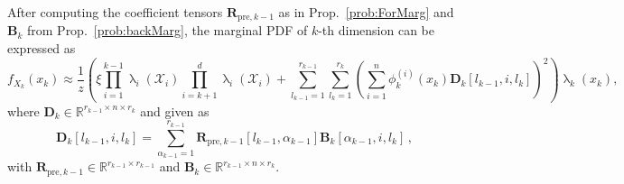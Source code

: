 After computing the coefficient tensors $\bm{R}_{\text{pre},k-1}$ as in Prop.~\ref{prob:ForMarg} and $\bm{B}_{k}$ from Prop.~\ref{prob:backMarg}, the marginal PDF of $k$-th dimension can be expressed as
\begin{equation}
	f_{X_k}(x_k)  \approx \frac{1}{z} \left(\xi \prod_{i=1}^{k-1} \uplambda_i(\mathcal{X}_i) \prod_{i=k+1}^{d} \uplambda_i(\mathcal{X}_i) + \sum_{l_{k-1}=1}^{r_{k-1}} \sum_{l_k=1}^{r_k} \left(\sum_{i=1}^{n} \phi^{(i)}_k(x_k) \bm{D}_k[l_{k-1},i, l_k] \right)^2 \right) \uplambda_k(x_k), \label{eq:MargTT}
\end{equation}
where $\bm{D}_k \in \mathbb{R}^{r_{k-1} \times n \times r_k}$ and given as
\begin{equation}
	\bm{D}_k[l_{k-1},i,l_k] = \sum_{\alpha_{k-1}=1}^{r_{k-1}}  \bm{R}_{\text{pre},k-1}[l_{k-1}, \alpha_{k-1}] \bm{B}_k[\alpha_{k-1}, i, l_k] \, ,
\end{equation}
with $\bm{R}_{\text{pre},k-1}\in \mathbb{R}^{r_{k-1} \times r_{k-1}}$ and $\bm{B}_k \in \mathbb{R}^{r_{k-1} \times n \times r_k}$.

